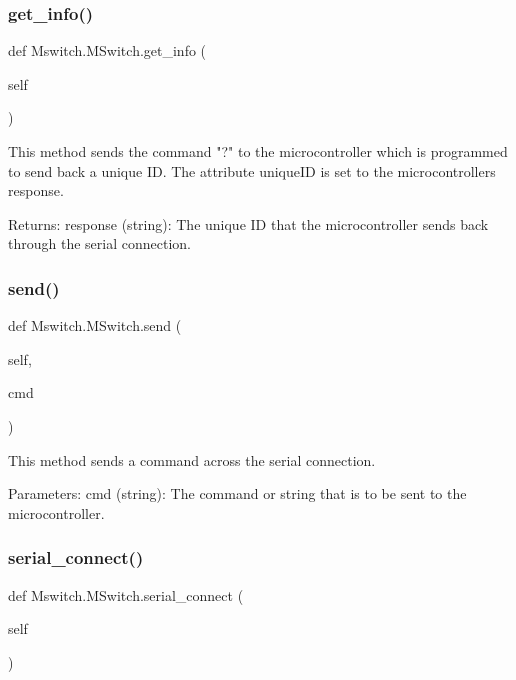 \subsubsection{\texorpdfstring{get\_info()}{get\_info()}}
{\footnotesize\ttfamily def Mswitch.\+M\+Switch.\+get\+\_\+info (\begin{DoxyParamCaption}\item[{}]{self }\end{DoxyParamCaption})}

\begin{DoxyVerb}This method sends the command "?" to the microcontroller which is programmed to send back a unique ID. The attribute uniqueID is set to the microcontrollers response.

Returns:
    response (string): The unique ID that the microcontroller sends back through the serial connection.
\end{DoxyVerb}
 \mbox{\label{class_mswitch_1_1_m_switch_a5ed9dff363e8dcc66e12d6d9583ed491}} 
\subsubsection{\texorpdfstring{send()}{send()}}
{\footnotesize\ttfamily def Mswitch.\+M\+Switch.\+send (\begin{DoxyParamCaption}\item[{}]{self,  }\item[{}]{cmd }\end{DoxyParamCaption})}

\begin{DoxyVerb}This method sends a command across the serial connection.

Parameters:
    cmd (string): The command or string that is to be sent to the microcontroller.
\end{DoxyVerb}
 \mbox{\label{class_mswitch_1_1_m_switch_a1ea0e8470eaf51e2971ebbc55632b394}} 
\subsubsection{\texorpdfstring{serial\_connect()}{serial\_connect()}}
{\footnotesize\ttfamily def Mswitch.\+M\+Switch.\+serial\+\_\+connect (\begin{DoxyParamCaption}\item[{}]{self }\end{DoxyParamCaption})}

